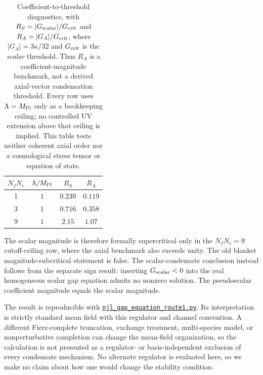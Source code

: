 \documentclass[aps,prd,twocolumn,superscriptaddress,preprintnumbers,nofootinbib,longbibliography,floatfix]{revtex4-2}
\newcommand{\artifactnamed}[2]{\href{https://github.com/Hubify-Projects/bigbounce/blob/7befce143848b925998a3e6ecc850aa510ab3a94/#1}{\nolinkurl{#2}}}
\begin{document}
\begin{table}[tb]
\caption{Coefficient-to-threshold diagnostics, with
$R_S=|G_{\rm scalar}|/G_{\rm crit}$ and
$R_A=|G_A|/G_{\rm crit}$, where $|G_A|=3\kappa/32$ and $G_{\rm crit}$ is the
\emph{scalar} threshold.  Thus $R_A$ is a coefficient-magnitude benchmark, not
a derived axial-vector condensation threshold.  Every row uses
$\Lambda=M_{\rm Pl}$ only as a bookkeeping ceiling; no controlled UV extension
above that ceiling is implied.  This table tests neither
coherent axial order nor a cosmological stress tensor or equation of state.}
\begin{ruledtabular}
\begin{tabular}{cccc}
$N_fN_c$ & $\Lambda/M_{\rm Pl}$ & $R_S$ & $R_A$ \\
\hline
1 & $1$ & $0.239$ & $0.119$ \\
3 & $1$ & $0.716$ & $0.358$ \\
9 & $1$ & $2.15$ & $1.07$ \\
\end{tabular}
\end{ruledtabular}
\end{table}

The scalar magnitude is therefore formally supercritical only in the
$N_fN_c=9$ cutoff-ceiling row, where the axial benchmark also exceeds unity.
The old blanket
magnitude-subcritical statement is false.  The scalar-condensate conclusion
instead follows from the separate sign result: inserting
$G_{\rm scalar}<0$ into the real homogeneous scalar gap equation admits no
nonzero solution.  The pseudoscalar coefficient magnitude equals the scalar
magnitude.

The result is reproducible with
\artifactnamed{arxiv/scripts/njl_gap_equation_route1.py}{njl_gap_equation_route1.py}.  Its interpretation is
strictly standard mean field with this regulator and channel convention.  A
different Fierz-complete truncation, exchange treatment, multi-species model,
or nonperturbative completion can change the mean-field organization, so the
calculation is not presented as a regulator- or basis-independent exclusion
of every condensate mechanism.  No alternate regulator is evaluated here, so
we make no claim about how one would change the stability condition.
\end{document}
